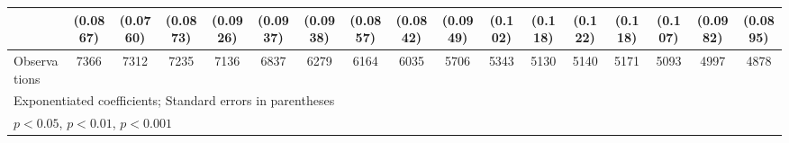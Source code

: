 {\begin{tabular}{l*{16}{c}}
                    &    (0.0867)         &    (0.0760)         &    (0.0873)         &    (0.0926)         &    (0.0937)         &    (0.0938)         &    (0.0857)         &    (0.0842)         &    (0.0949)         &     (0.102)         &     (0.118)         &     (0.122)         &     (0.118)         &     (0.107)         &    (0.0982)         &    (0.0895)         \\
\hline
Observations        &        7366         &        7312         &        7235         &        7136         &        6837         &        6279         &        6164         &        6035         &        5706         &        5343         &        5130         &        5140         &        5171         &        5093         &        4997         &        4878         \\
\hline\hline
\multicolumn{17}{l}{\footnotesize Exponentiated coefficients; Standard errors in parentheses}\\
\multicolumn{17}{l}{\footnotesize \sym{*} \(p<0.05\), \sym{**} \(p<0.01\), \sym{***} \(p<0.001\)}\\
\end{tabular}
}
